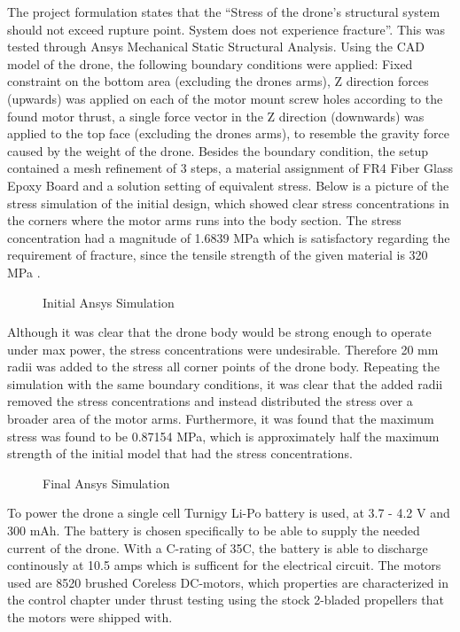 The project formulation states that the “Stress of the drone’s structural system should not exceed rupture point. System does not experience fracture”. This was tested through Ansys Mechanical Static Structural Analysis. Using the CAD model of the drone, the following boundary conditions were applied: Fixed constraint on the bottom area (excluding the drones arms), Z direction forces (upwards) was applied on each of the motor mount screw holes according to the found motor thrust, a single force vector in the Z direction (downwards) was applied to the top face (excluding the drones arms), to resemble the gravity force caused by the weight of the drone. Besides the boundary condition, the setup contained a mesh refinement of 3 steps, a material assignment of FR4 Fiber Glass Epoxy Board and a solution setting of equivalent stress. Below is a picture of the stress simulation of the initial design, which showed clear stress concentrations in the corners where the motor arms runs into the body section. The stress concentration had a magnitude of 1.6839 MPa which is satisfactory regarding the requirement of fracture, since the tensile strength of the given material is 320 MPa \cite{FR4}. 

\begin{figure}[H]%
    \centering
    \caption{Initial Ansys Simulation}%
    \label{fig:example}%
\end{figure}

Although it was clear that the drone body would be strong enough to operate under max power, the stress concentrations were undesirable. Therefore 20 mm radii was added to the stress all corner points of the drone body. Repeating the simulation with the same boundary conditions, it was clear that the added radii removed the stress concentrations and instead distributed the stress over a broader area of the motor arms. Furthermore, it was found that the maximum stress was found to be 0.87154 MPa, which is approximately half the maximum strength of the initial model that had the stress concentrations.

\begin{figure}[H]%
    \centering
    \caption{Final Ansys Simulation}%
    \label{fig:example}%
\end{figure}

To power the drone a single cell Turnigy Li-Po battery is used, at 3.7 - 4.2 V and 300 mAh. The battery is chosen specifically to be able to supply the needed current of the drone. With a C-rating of 35C, the battery is able to discharge continously at 10.5 amps which is sufficent for the electrical circuit. The motors used are 8520 brushed Coreless DC-motors, which properties are characterized in the control chapter under thrust testing using the stock 2-bladed propellers that the motors were shipped with. 

